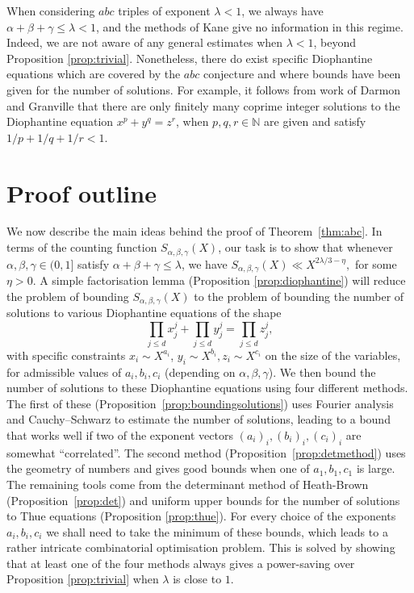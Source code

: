 When considering $abc$ triples of exponent $\lambda<1$, we always have $\alpha+\beta+\gamma\leq \lambda< 1$, and  the methods of Kane give no information
in this regime. Indeed, we are not aware of any general estimates when $\lambda<1$,
 beyond  Proposition \ref{prop:trivial}. Nonetheless, there do exist    specific Diophantine equations which are covered by the $abc$ conjecture and where bounds have been given for the number of solutions.
For example, it follows from work of Darmon and
Granville \cite{DG} that there are only finitely many coprime integer solutions to the Diophantine equation $x^p+y^q=z^r$, when $p,q,r\in \mathbb{N}$ are given and satisfy $1/p+1/q+1/r<1$.


\section*{Proof outline} We now describe the main ideas behind  the proof of Theorem~\ref{thm:abc}. In terms of the counting function $S_{\alpha,\beta,\gamma}(X)$, our task is to show that whenever $\alpha,\beta,\gamma\in (0,1]$ satisfy $\alpha+\beta+\gamma\leq \lambda$, we have
$
S_{\alpha,\beta,\gamma}(X)\ll X^{2\lambda/3-\eta},
$
for some $\eta>0$.
A simple factorisation lemma (Proposition \ref{prop:diophantine}) will  reduce the problem of bounding $S_{\alpha,\beta,\gamma}(X)$ to the problem of bounding the number of solutions to various Diophantine equations of the shape
$$
\prod_{j\leq d}x_j^j+\prod_{j\leq d}y_j^j=\prod_{j\leq d}z_j^j ,
$$
with specific constraints $x_i\sim X^{a_i}$, $y_i\sim X^{b_i}, z_i\sim X^{c_i}$ on the size of the variables, for admissible values of $a_i,b_i,c_i$ (depending on $\alpha,\beta,\gamma$).
We then bound the number of solutions to these Diophantine equations using four different methods.  The first of these (Proposition~\ref{prop:boundingsolutions}) uses Fourier analysis and Cauchy--Schwarz to estimate the number of solutions, leading to a bound that works well if two of the exponent vectors $(a_i)_i,(b_i)_i,(c_i)_i$ are somewhat ``correlated''. The second method (Proposition~\ref{prop:detmethod}) uses the geometry of numbers and gives good bounds when
one of $a_1,b_1,c_1$ is large. The remaining tools come from the determinant method of Heath-Brown (Proposition~\ref{prop:det}) and
uniform upper bounds for the number of solutions to Thue equations (Proposition
\ref{prop:thue}).
For every choice of the exponents $a_i,b_i,c_i$ we shall need to take the minimum of these bounds, which leads  to a rather intricate combinatorial optimisation problem. This is solved by
showing that at least one of the four  methods  always gives a power-saving over Proposition
\ref{prop:trivial}
when $\lambda$ is close to $1$.


